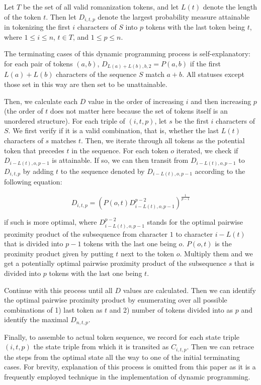 \documentclass[a4paper,11pt,twocolumn]{article}
\begin{document}
Let $T$ be the set of all valid romanization tokens, and let $L(t)$ denote the length of the token $t$. Then let $D_{i, t, p}$ denote the largest probability measure attainable in tokenizing the first $i$ characters of $S$ into $p$ tokens with the last token being $t$, where $1 \le i \le n$, $t \in T$, and $1 \le p \le n$.

The terminating cases of this dynamic programming process is self-explanatory: for each pair of tokens $(a, b)$, $D_{L(a)+L(b),b,2}=P(a,b)$ if the first $L(a)+L(b)$ characters of the sequence $S$ match $a+b$. All statuses except those set in this way are then set to be unattainable.

Then, we calculate each $D$ value in the order of increasing $i$ and then increasing $p$ (the order of $t$ does not matter here because the set of tokens itself is an unordered structure). For each triple of $(i, t, p)$, let $s$ be the first $i$ characters of $S$. We first verify if it is a valid combination, that is, whether the last $L(t)$ characters of $s$ matches $t$. Then, we iterate through all tokens as the potential token that precedes $t$ in the sequence. For each token $o$ iterated, we check if $D_{i-L(t), o, p-1}$ is attainable. If so, we can then transit from $D_{i-L(t), o, p-1}$ to $D_{i, t, p}$ by adding $t$ to the sequence denoted by $D_{i-L(t), o, p-1}$ according to the following equation:

$$D_{i, t, p} = \left(P(o, t) D_{i-L(t), o, p-1}^{p-2}\right)^{\frac{1}{p-1}}$$

if such is more optimal, where $D_{i-L(t), o, p-1}^{p-2}$ stands for the optimal pairwise proximity product of the subsequence from character $1$ to character $i-L(t)$ that is divided into $p-1$ tokens with the last one being $o$. $P(o, t)$ is the proximity product given by putting $t$ next to the token $o$. Multiply them and we get a potentially optimal pairwise proximity product of the subsequence $s$ that is divided into $p$ tokens with the last one being $t$.

Continue with this process until all $D$ values are calculated. Then we can identify the optimal pairwise proximity product by enumerating over all possible combinations of 1) last token as $t$ and 2) number of tokens divided into as $p$ and identify the maximal $D_{n,t,p}$.

Finally, to assemble to actual token sequence, we record for each state triple $(i, t, p)$ the state triple from which it is transited as $C_{i, t, p}$. Then we can retrace the steps from the optimal state all the way to one of the initial terminating cases. For brevity, explanation of this process is omitted from this paper as it is a frequently employed technique in the implementation of dynamic programming.
\end{document}
